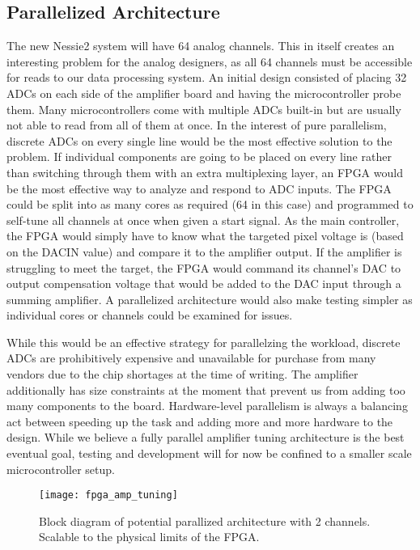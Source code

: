 \subsection{Parallelized Architecture}
The new Nessie2 system will have 64 analog channels. This in itself creates an interesting problem for the analog designers, as all 64 channels must be accessible for reads to our data processing system. An initial design consisted of placing 32 ADCs on each side of the amplifier board and having the microcontroller probe them.  Many microcontrollers come with multiple ADCs built-in but are usually not able to read from all of them at once. In the interest of pure parallelism, discrete ADCs on every single line would be the most effective solution to the problem. If individual components are going to be placed on every line rather than switching through them with an extra multiplexing layer, an FPGA would be the most effective way to analyze and respond to ADC inputs. The FPGA could be split into as many cores as required (64 in this case) and programmed to self-tune all channels at once when given a start signal. As the main controller, the FPGA would simply have to know what the targeted pixel voltage is (based on the DACIN value) and compare it to the amplifier output. If the amplifier is struggling to meet the target, the FPGA would command its channel's DAC to output compensation voltage that would be added to the DAC input through a summing amplifier. A parallelized architecture would also make testing simpler as individual cores or channels could be examined for issues. \par
While this would be an effective strategy for parallelzing the workload, discrete ADCs are prohibitively expensive and unavailable for purchase from many vendors due to the chip shortages at the time of writing. The amplifier additionally has size constraints at the moment that prevent us from adding too many components to the board. Hardware-level parallelism is always a balancing act between speeding up the task and adding more and more hardware to the design. While we believe a fully parallel amplifier tuning architecture is the best eventual goal, testing and development will for now be confined to a smaller scale microcontroller setup.
\FloatBarrier
\begin{figure}[!htb]
	\centering
	\texttt{[image: fpga\_amp\_tuning]}
	\caption{Block diagram of potential parallized architecture with 2 channels. Scalable to the physical limits of the FPGA.}
\end{figure}
\FloatBarrier
